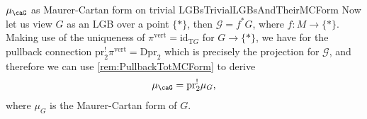\documentclass[reqno,a4paper,oneside]{amsart}
\newcommand\mutot{\mu_\caG}
\theoremstyle{plain}
\theoremstyle{remark}
\theoremstyle{definition}
\def\bas#1\eas{\begin{align*}#1\end{align*}}
\begin{document}
\begin{remarks}{$\mutot$ as Maurer-Cartan form on trivial LGBs}{TrivialLGBsAndTheirMCForm}
Now let us view $G$ as an LGB over a point $\{*\}$, then $\mathcal{G} = f^*G$, where $f: M \to \{*\}$. Making use of the uniqueness of $\pi^{\mathrm{vert}} = \mathrm{id}_{\mathrm{T}G}$ for $G \to \{*\}$, we have for the pullback connection $\mathrm{pr}_2^!\pi^{\mathrm{vert}} = \mathrm{Dpr}_2$ which is precisely the projection for $\mathcal{G}$, and therefore we can use \ref{rem:PullbackTotMCForm} to derive
\begin{equation*}
\mutot
=
\mathrm{pr}_2^!\mu_G,
\end{equation*}
where $\mu_G$ is the Maurer-Cartan form of $G$.
%
\end{remarks}
\end{document}
